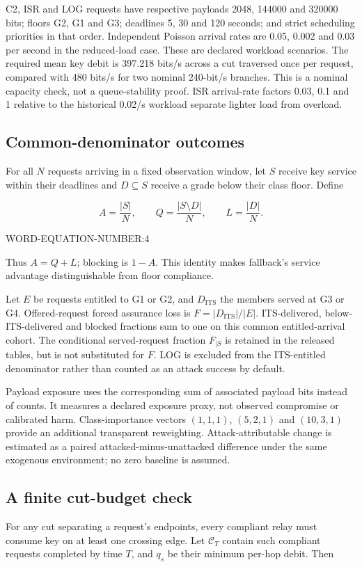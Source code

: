 \documentclass[conference,a4paper]{IEEEtran}
\begin{document}
C2, ISR and LOG requests have respective payloads 2048, 144000 and 320000 bits; floors G2, G1 and G3; deadlines 5, 30 and 120 seconds; and strict scheduling priorities in that order. Independent Poisson arrival rates are 0.05, 0.002 and 0.03 per second in the reduced-load case. These are declared workload scenarios. The required mean key debit is 397.218 bits/s across a cut traversed once per request, compared with 480 bits/s for two nominal 240-bit/s branches. This is a nominal capacity check, not a queue-stability proof. ISR arrival-rate factors 0.03, 0.1 and 1 relative to the historical 0.02/s workload separate lighter load from overload.

\subsection{Common-denominator outcomes}\label{sec:metrics}
For all $N$ requests arriving in a fixed observation window, let $S$ receive key service within their deadlines and $D\subseteq S$ receive a grade below their class floor. Define


\[
A=\frac{|S|}{N},\qquad Q=\frac{|S\setminus D|}{N},\qquad L=\frac{|D|}{N}.
\]

WORD-EQUATION-NUMBER:4


Thus $A=Q+L$; blocking is $1-A$. This identity makes fallback's service advantage distinguishable from floor compliance.

Let $E$ be requests entitled to G1 or G2, and $D_{\mathrm{ITS}}$ the members served at G3 or G4. Offered-request forced assurance loss is $F=|D_{\mathrm{ITS}}|/|E|$. ITS-delivered, below-ITS-delivered and blocked fractions sum to one on this common entitled-arrival cohort. The conditional served-request fraction $F_{\mid S}$ is retained in the released tables, but is not substituted for $F$. LOG is excluded from the ITS-entitled denominator rather than counted as an attack success by default.

Payload exposure uses the corresponding sum of associated payload bits instead of counts. It measures a declared exposure proxy, not observed compromise or calibrated harm. Class-importance vectors $(1,1,1)$, $(5,2,1)$ and $(10,3,1)$ provide an additional transparent reweighting. Attack-attributable change is estimated as a paired attacked-minus-unattacked difference under the same exogenous environment; no zero baseline is assumed.

\subsection{A finite cut-budget check}\label{sec:bound}
For any cut separating a request's endpoints, every compliant relay must consume key on at least one crossing edge. Let $\mathcal C_T$ contain such compliant requests completed by time $T$, and $q_s$ be their minimum per-hop debit. Then
\end{document}
